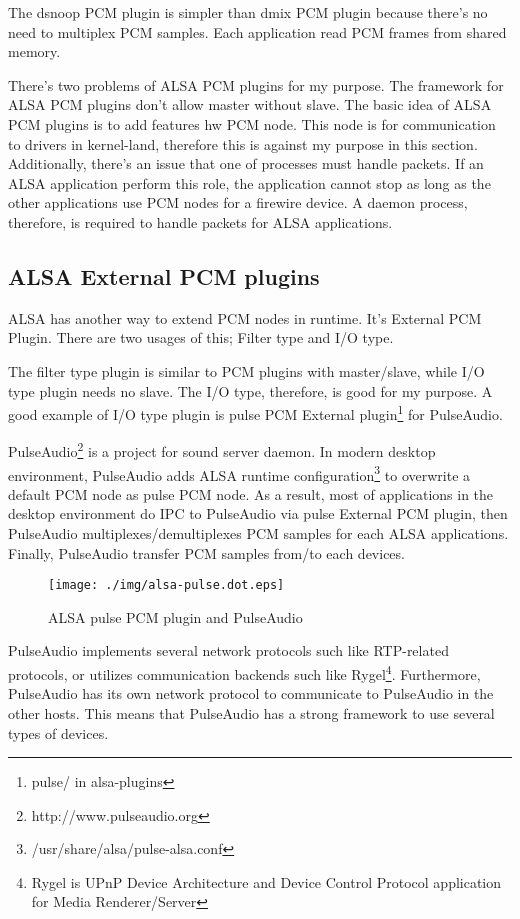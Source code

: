\documentclass[onecolumn]{article}
\begin{document}
The dsnoop PCM plugin is simpler than dmix PCM plugin because there's no need to multiplex PCM samples. Each application read PCM frames from shared memory.

There's two problems of ALSA PCM plugins for my purpose. The framework for ALSA PCM plugins don't allow master without slave. The basic idea of ALSA PCM plugins is to add features hw PCM node. This node is for communication to drivers in kernel-land, therefore this is against my purpose in this section. Additionally, there's an issue that one of processes must handle packets. If an ALSA application perform this role, the application cannot stop as long as the other applications use PCM nodes for a firewire device. A daemon process, therefore, is required to handle packets for ALSA applications.


\subsection{ALSA External PCM plugins}
ALSA has another way to extend PCM nodes in runtime. It's External PCM Plugin\cite{alsa-lib}. There are two usages of this; Filter type and I/O type.

The filter type plugin is similar to PCM plugins with master/slave, while I/O type plugin needs no slave. The I/O type, therefore, is good for my purpose. A good example of I/O type plugin is pulse PCM External plugin\footnote{pulse/ in alsa-plugins} for PulseAudio.

PulseAudio\footnote{http://www.pulseaudio.org} is a project for sound server daemon. In modern desktop environment, PulseAudio adds ALSA runtime configuration\footnote{/usr/share/alsa/pulse-alsa.conf} to overwrite a default PCM node as pulse PCM node. As a result, most of applications in the desktop environment do IPC to PulseAudio via pulse External PCM plugin, then PulseAudio multiplexes/demultiplexes PCM samples for each ALSA applications. Finally, PulseAudio transfer PCM samples from/to each devices.

\begin{figure}[H]
	\centering
	\texttt{[image: ./img/alsa-pulse.dot.eps]}
	\caption{ALSA pulse PCM plugin and PulseAudio}
	\label{alsa-pulse}
\end{figure}

PulseAudio implements several network protocols such like RTP-related protocols, or utilizes communication backends such like Rygel\footnote{Rygel is UPnP Device Architecture and Device Control Protocol application for Media Renderer/Server}. Furthermore, PulseAudio has its own network protocol to communicate to PulseAudio in the other hosts. This means that PulseAudio has a strong framework to use several types of devices.
\end{document}
